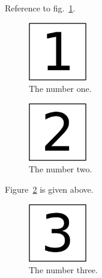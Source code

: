 \renewcommand{\figurename}{FIG}

\newcommand{\plusnamesingular}{}
\newcommand{\starnamesingular}{}
\newcommand{\xrefname}[1]{\protect\renewcommand{\plusnamesingular}{#1}}
\newcommand{\Xrefname}[1]{\protect\renewcommand{\starnamesingular}{#1}}
\providecommand{\cref}{\plusnamesingular~\ref}
\providecommand{\Cref}{\starnamesingular~\ref}
\providecommand{\crefformat}[2]{}
\providecommand{\Crefformat}[2]{}

\crefformat{figure}{fig.~#2#1#3}
\Crefformat{figure}{Figure~#2#1#3}

Reference to \xrefname{fig.}\cref{fig:1}.

\begin{figure}
\centering
\includegraphics[width=1.00000in]{img/fig-1.png}
\caption{The number one.\label{fig:1}}
\end{figure}

\begin{figure}
\centering
\includegraphics[width=1.00000in]{img/fig-2.png}
\caption{The number two.\label{fig:2}}
\end{figure}

\Xrefname{Figure}\Cref{fig:2} is given above.

\begin{figure}
\centering
\includegraphics[width=1.00000in]{img/fig-3.png}
\caption{The number three.}
\end{figure}
